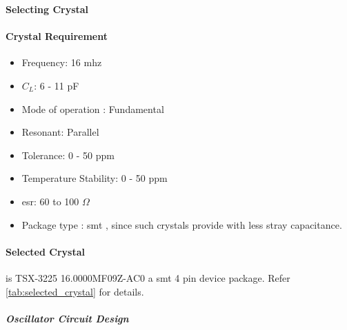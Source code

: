 	\textbf{Selecting Crystal}
	
	\paragraph{Crystal Requirement}
	
		\begin{itemize}
			\item Frequency: 16 \gls{mhz}
			\item $C_{L}$: 6 - 11 pF \cite{AtMega328P}
			\item Mode of operation : Fundamental 
			\item Resonant: Parallel
			\item Tolerance: 0 - 50 \acrshort{ppm}
			\item Temperature Stability: 0 - 50 \acrshort{ppm}
			\item \gls{esr}: 60 to 100 $\Omega$
			\item Package type : \gls{smt} , since such crystals provide with less stray capacitance.
		\end{itemize}
	
	\paragraph{Selected Crystal} 
	is TSX-3225 16.0000MF09Z-AC0 a \gls{smt} 4 pin device package. Refer \ref{tab:selected_crystal} for details. 

	\subparagraph*{Oscillator Circuit Design}
	
